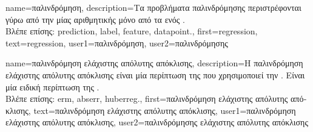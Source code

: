 {name={\foreignlanguage{greek}{παλινδρόμηση}},
	description={\foreignlanguage{greek}{Τα προβλήματα παλινδρόμησης} 
		\foreignlanguage{greek}{περιστρέφονται γύρω από την}  
		 \foreignlanguage{greek}{μίας αριθμητικής}  \foreignlanguage{greek}{μόνο από τα} 
		 \foreignlanguage{greek}{ενός}  \cite[\foreignlanguage{greek}{Κεφ.} 2]{MLBasics}.\\
		\foreignlanguage{greek}{Βλέπε επίσης:} \gls{prediction}, \gls{label}, \gls{feature}, \gls{datapoint}.},
	first={regression},
	text={regression},
	user1={\foreignlanguage{greek}{παλινδρόμηση}}, %
  	user2={\foreignlanguage{greek}{παλινδρόμησης}} %
}

{name={\foreignlanguage{greek}{παλινδρόμηση ελάχιστης απόλυτης απόκλισης}},
	description={\foreignlanguage{greek}{Η παλινδρόμηση ελά\-χιστης απόλυτης 
		απόκλισης} 
		\foreignlanguage{greek}{είναι μία περίπτωση της}  \foreignlanguage{greek}{που 
		χρησιμοποιεί την} . \foreignlanguage{greek}{Είναι μία ειδική περίπτωση της} 
		.\\
		\foreignlanguage{greek}{Βλέπε επίσης:} \gls{erm}, \gls{abserr}, \gls{huberreg}.},
	first={\foreignlanguage{greek}{παλινδρόμηση ελάχιστης απόλυτης απόκλισης}},
	text={\foreignlanguage{greek}{παλινδρόμηση ελάχιστης απόλυτης απόκλισης}},
	user1={\foreignlanguage{greek}{παλινδρόμηση ελάχιστης απόλυτης απόκλισης}}, %
	user2={\foreignlanguage{greek}{παλινδρόμησης ελάχιστης απόλυτης απόκλισης}} %
}

